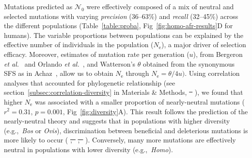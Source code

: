 \documentclass[10pt,letterpaper]{article}
\newcommand{\Ne}{N_{\text{e}}}
\newcommand{\SphyNeu}{\mathcal{N}_0}
\providecommand{\DIFaddtex}[1]{{\protect\color{blue}\uwave{#1}}} %
\providecommand{\DIFdeltex}[1]{{\protect\color{red}\sout{#1}}}                      %
\providecommand{\DIFaddbegin}{} %
\providecommand{\DIFaddend}{} %
\providecommand{\DIFdelbegin}{} %
\providecommand{\DIFdelend}{} %
\providecommand{\DIFadd}[1]{\texorpdfstring{\DIFaddtex{#1}}{#1}} %
\providecommand{\DIFdel}[1]{\texorpdfstring{\DIFdeltex{#1}}{}} %
\newcommand{\DIFscaledelfig}{0.5}
\newlength{\DIFdelgraphicswidth} %
\newlength{\DIFdelgraphicsheight} %
\newcommand{\DIFaddincludegraphics}[2][]{{\color{blue}\fbox{\DIFOincludegraphics[#1]{#2}}}} %
\newcommand{\DIFdelincludegraphics}[2][]{%
\sbox{\DIFdelgraphicsbox}{\DIFOincludegraphics[#1]{#2}}%
\settoboxwidth{\DIFdelgraphicswidth}{\DIFdelgraphicsbox} %
\settoboxtotalheight{\DIFdelgraphicsheight}{\DIFdelgraphicsbox} %
\scalebox{\DIFscaledelfig}{%
\parbox[b]{\DIFdelgraphicswidth}{\usebox{\DIFdelgraphicsbox}\\[-\baselineskip] \rule{\DIFdelgraphicswidth}{0em}}\llap{\resizebox{\DIFdelgraphicswidth}{\DIFdelgraphicsheight}{%
\setlength{\unitlength}{\DIFdelgraphicswidth}%
\begin{picture}(1,1)%
\thicklines\linethickness{2pt} %
{\color[rgb]{1,0,0}\put(0,0){\framebox(1,1){}}}%
{\color[rgb]{1,0,0}\put(0,0){\line( 1,1){1}}}%
{\color[rgb]{1,0,0}\put(0,1){\line(1,-1){1}}}%
\end{picture}%
}\hspace*{3pt}}} %
} %
\DeclareRobustCommand{\DIFaddbegin}{\DIFOaddbegin \let\includegraphics\DIFaddincludegraphics} %
\DeclareRobustCommand{\DIFaddend}{\DIFOaddend \let\includegraphics\DIFOincludegraphics} %
\DeclareRobustCommand{\DIFdelbegin}{\DIFOdelbegin \let\includegraphics\DIFdelincludegraphics} %
\DeclareRobustCommand{\DIFdelend}{\DIFOaddend \let\includegraphics\DIFOincludegraphics} %
\begin{document}
Mutations predicted as $\SphyNeu$ were effectively composed of a mix of neutral and selected mutations with varying \textit{precision} (36--63\%) and \textit{recall} (32--45\%) across the different populations (Table~\ref{table:proba}, Fig~\ref{fig:homo-afr-results}D for humans).
The variable proportions between populations can be explained by the effective number of individuals in the population ($\Ne$), a major driver of selection efficacy.
Moreover, estimates of mutation rate per generation ($u$), from Bergeron \textit{et al.}~\cite{bergeron_evolution_2023} and Orlando \textit{et al.}~\cite{orlando_recalibrating_2013}, and Watterson’s $\theta$ obtained from the synonymous SFS as in Achaz~\cite{achaz_frequency_2009}, allow us to obtain $\Ne$ through $\Ne=\theta/4 u)$.
Using correlation analyses that accounted for phylogenetic relationship (see section~\ref{subsec:correlation-diversity} in Materials \& Methods, \DIFdelbegin \DIFdel{~}%
\DIFdelend \DIFaddbegin \DIFadd{Fig~E in~}\DIFaddend ), we found that higher $\Ne$ was associated with a smaller proportion of nearly-neutral mutations ($r^2=0.31$, $p=0.001$, Fig~\ref{fig:diversity}A).
This result follows the prediction of the nearly-neutral theory and suggests that in populations with higher diversity (e.g.,~\textit{Bos} or \textit{Ovis}), discrimination between beneficial and deleterious mutations is more likely to occur (\DIFdelbegin %
\DIFdel{,~}%
\DIFdel{,~}%
\DIFdelend \DIFaddbegin \DIFadd{Fig~F-H in~}\DIFaddend ).
Conversely, many more mutations are effectively neutral in populations with lower diversity (e.g.,~\textit{Homo}).
\end{document}

